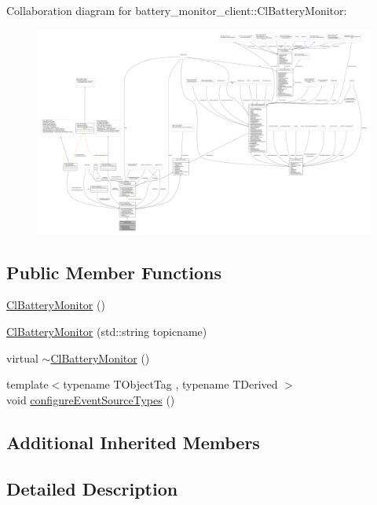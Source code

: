 Collaboration diagram for battery\+\_\+monitor\+\_\+client\+:\+:Cl\+Battery\+Monitor\+:
\nopagebreak
\begin{figure}[H]
\begin{center}
\leavevmode
\includegraphics[width=350pt]{classbattery__monitor__client_1_1ClBatteryMonitor__coll__graph}
\end{center}
\end{figure}
\subsection*{Public Member Functions}
\begin{DoxyCompactItemize}
\item 
\hyperlink{classbattery__monitor__client_1_1ClBatteryMonitor_a8788abf573a0d50bd24dbd3b0b752d0c}{Cl\+Battery\+Monitor} ()
\item 
\hyperlink{classbattery__monitor__client_1_1ClBatteryMonitor_ab09c854017369ba50938ce8cfbb54b40}{Cl\+Battery\+Monitor} (std\+::string topicname)
\item 
virtual \hyperlink{classbattery__monitor__client_1_1ClBatteryMonitor_a04bf9d943a21d6cb2433190d73d1422a}{$\sim$\+Cl\+Battery\+Monitor} ()
\item 
{\footnotesize template$<$typename T\+Object\+Tag , typename T\+Derived $>$ }\\void \hyperlink{classbattery__monitor__client_1_1ClBatteryMonitor_a8a9f26b32a60046d3ec8c5e92ac9b967}{configure\+Event\+Source\+Types} ()
\end{DoxyCompactItemize}
\subsection*{Additional Inherited Members}


\subsection{Detailed Description}


